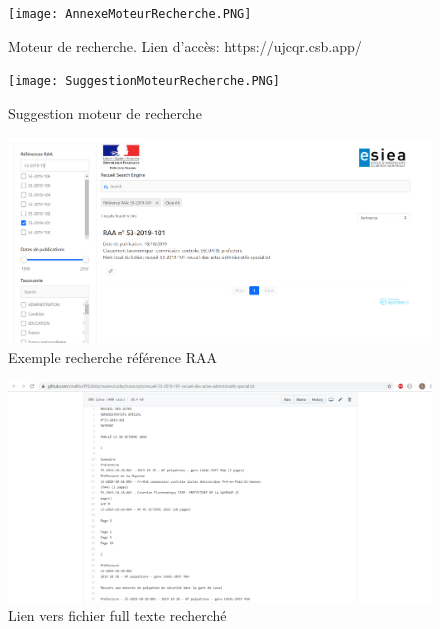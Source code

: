 \begin{figure}[h!]
  \texttt{[image: AnnexeMoteurRecherche.PNG]}
	\caption{Moteur de recherche. Lien d'accès: https://ujcqr.csb.app/}
	\label{}
\end{figure}

\begin{figure}[h!]
  \texttt{[image: SuggestionMoteurRecherche.PNG]}
	\caption{Suggestion moteur de recherche}
	\label{}
\end{figure}

\begin{figure}[h!]
  \includegraphics[width=\linewidth]{images/rechercheReferenceMoteurRecherche.PNG}
	\caption{Exemple recherche référence RAA}
	\label{}
\end{figure}

\begin{figure}[h!]
  \includegraphics[width=\linewidth]{images/annexeLienVersRecherche.PNG}
	\caption{Lien vers fichier full texte recherché}
	\label{}
\end{figure}
\newpage
\mbox{~}
